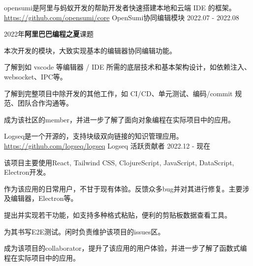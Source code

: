 

\begin{cventries}


\cventry
    {opensumi是阿里与蚂蚁开发的帮助开发者快速搭建本地和云端 IDE 的框架。\href{https://github.com/opensumi/core}{https://github.com/opensumi/core}} %
    {OpenSumi协同编辑模块} %
    {} %
    {2022.07 - 2022.08} %
    {
      \begin{cvitems} %
        \item {2022年\textbf{阿里巴巴编程之夏}课题}
        \item {本次开发的模块，大致实现基本的编辑器协同编辑功能。}
        \item {了解到如 vscode 等编辑器 / IDE 所需的底层技术和基本架构设计，如依赖注入、websocket、IPC等。}
        \item {了解到完整项目中除开发的其他工作，如 CI/CD、单元测试、编码/commit 规范、团队合作沟通等。}
        \item {成为该社区的member，并进一步了解了面向对象编程在实际项目中的应用。}
      \end{cvitems}
    }


\cventry
    {Logseq是一个开源的，支持块级双向链接的知识管理应用。\href{https://github.com/logseq/logseq}{https://github.com/logseq/logseq}} %
    {Logseq 活跃贡献者} %
    {} %
    {2022.12 - 现在} %
    {
      \begin{cvitems} %
        \item {该项目主要使用React, Tailwind CSS, ClojureScript, JavaScript, DataScript, Electron开发。}
        \item {作为该应用的日常用户，不甘于现有体验。反馈众多bug并对其进行修复。主要涉及编辑器，Electron等。}
        \item {提出并实现若干功能，如支持多种格式粘贴，便利的剪贴板数据查看工具。}
        \item {为其书写E2E测试。闲时负责维护该项目的issues区。}
        \item {成为该项目的collaborator，提升了该应用的用户体验，并进一步了解了函数式编程在实际项目中的应用。}
      \end{cvitems}
    }

\end{cventries}
